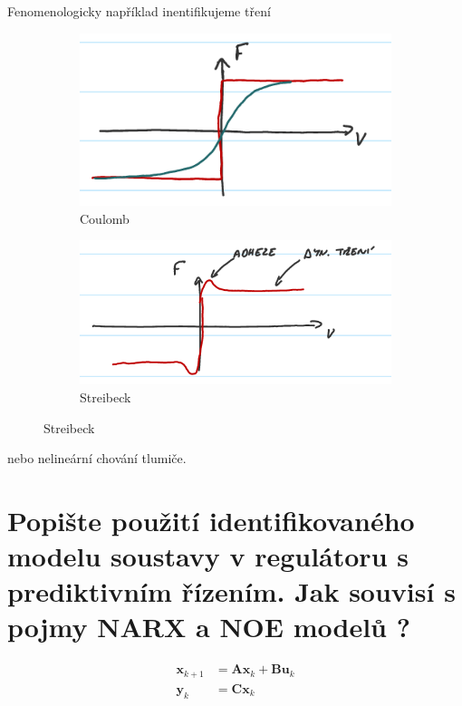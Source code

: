 \documentclass{article}
\begin{document}
	Fenomenologicky například inentifikujeme tření
	\begin{figure}[ht!]
		\begin{subfigure}[h!]{.49\textwidth}
			\centering
			\includegraphics[width=\linewidth]{figs/Coulomb.png}
			\caption{Coulomb}
		\end{subfigure}
		\hfill
		\begin{subfigure}[h!]{.49\textwidth}
			\centering
			\includegraphics[width=\linewidth]{figs/Streibeck.png}
			\caption{Streibeck}
		\end{subfigure}
	\end{figure}
	nebo nelineární chování tlumiče.

	\section{Popište použití identifikovaného modelu soustavy v regulátoru s prediktivním řízením. Jak souvisí s pojmy NARX a NOE modelů ? }

	\begin{align}
		\bm{x}_{k+1} &= \bm{A}\bm{x}_k + \bm{B}\bm{u}_k \\
		\bm{y}_k &= \bm{C}\bm{x}_k
	\end{align}
\end{document}
